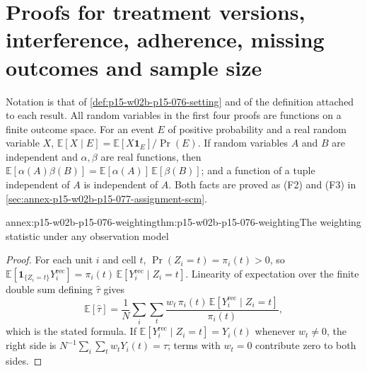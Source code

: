 \section{Proofs for treatment versions, interference, adherence, missing outcomes and sample size}
\label{sec:annex-p15-w02b-p15-076}

Notation is that of \cref{def:p15-w02b-p15-076-setting} and of the
definition attached to each result. All random variables in the first four
proofs are functions on a finite outcome space. For an event \(E\) of
positive probability and a real random variable \(X\),
\(\mathbb E[X\mid E]=\mathbb E[X\mathbf 1_E]/\Pr(E)\). If random variables
\(A\) and \(B\) are independent and \(\alpha,\beta\) are real functions,
then \(\mathbb E[\alpha(A)\beta(B)]=\mathbb E[\alpha(A)]\,\mathbb E[\beta(B)]\);
and a function of a tuple independent of \(A\) is independent of \(A\).
Both facts are proved as (F2) and (F3) in
\cref{sec:annex-p15-w02b-p15-077-assignment-scm}.

\begin{annexitem}{annex:p15-w02b-p15-076-weighting}{thm:p15-w02b-p15-076-weighting}{The weighting statistic under any observation model}
\begin{proof}
For each unit \(i\) and cell \(t\), \(\Pr(Z_i=t)=\pi_i(t)>0\), so
\(\mathbb E[\mathbf 1_{\{Z_i=t\}}Y_i^{\mathrm{rec}}]
 =\pi_i(t)\,\mathbb E[Y_i^{\mathrm{rec}}\mid Z_i=t]\).
Linearity of expectation over the finite double sum defining
\(\widehat\tau\) gives
\[
 \mathbb E[\widehat\tau]=\frac1N\sum_i\sum_t
  \frac{w_t\,\pi_i(t)\,\mathbb E[Y_i^{\mathrm{rec}}\mid Z_i=t]}{\pi_i(t)},
\]
which is the stated formula. If
\(\mathbb E[Y_i^{\mathrm{rec}}\mid Z_i=t]=Y_i(t)\) whenever \(w_t\ne0\),
the right side is \(N^{-1}\sum_i\sum_tw_tY_i(t)=\tau\); terms with
\(w_t=0\) contribute zero to both sides.
\end{proof}
\end{annexitem}

